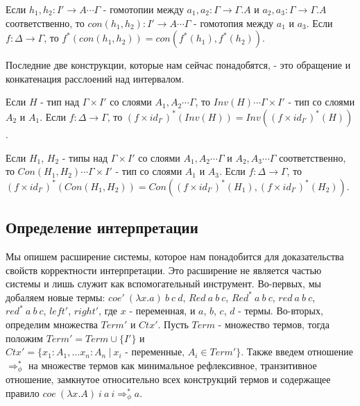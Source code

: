 \documentclass{amsart}
\theoremstyle{definition}
\theoremstyle{remark}
\newcommand{\red}{\Rightarrow}
\newcommand{\deq}{\Leftrightarrow}
\numberwithin{figure}{section}
\begin{document}
Если $h_1, h_2 : I' \to A \dotsb \Gamma$ - гомотопии между $a_1, a_2 : \Gamma \to \Gamma.A$ и $a_2, a_3 : \Gamma \to \Gamma.A$ соответственно,
    то $con(h_1, h_2) : I' \to A \dotsb \Gamma$ - гомотопия между $a_1$ и $a_3$.
Если $f : \Delta \to \Gamma$, то $f^*(con(h_1, h_2)) = con(f^*(h_1), f^*(h_2))$.

Последние две конструкции, которые нам сейчас понадобятся, - это обращение и конкатенация расслоений над интервалом.

Если $H$ - тип над $\Gamma \times I'$ со слоями $A_1, A_2 \dotsb \Gamma$, то $Inv(H) \dotsb \Gamma \times I'$ - тип со слоями $A_2$ и $A_1$.
Если $f : \Delta \to \Gamma$, то $(f \times id_{I'})^*(Inv(H)) = Inv((f \times id_{I'})^*(H))$.

Если $H_1$, $H_2$ - типы над $\Gamma \times I'$ со слоями $A_1, A_2 \dotsb \Gamma$ и $A_2, A_3 \dotsb \Gamma$ соответственно, то $Con(H_1, H_2) \dotsb \Gamma \times I'$ - тип со слоями $A_1$ и $A_3$.
Если $f : \Delta \to \Gamma$, то $(f \times id_{I'})^*(Con(H_1, H_2)) = Con((f \times id_{I'})^*(H_1), (f \times id_{I'})^*(H_2))$.

\subsection{Определение интерпретации}

Мы опишем расширение системы, которое нам понадобится для доказательства свойств корректности интерпретации.
Это расширение не является частью системы и лишь служит как вспомогательный инструмент.
Во-первых, мы добаляем новые термы: $coe'\ (\lambda x. a)\ b\ c\ d$, $Red\ a\ b\ c$, $Red^*\ a\ b\ c$, $red\ a\ b\ c$, $red^*\ a\ b\ c$, $left'$, $right'$, где $x$ - переменная, и $a$, $b$, $c$, $d$ - термы.
Во-вторых, определим множества $Term'$ и $Ctx'$.
Пусть $Term$ - множество термов, тогда положим $Term' = Term \cup \{ I' \}$ и $Ctx' = \{ x_1 : A_1, \ldots x_n : A_n\ |\ x_i \text{ - переменные, } A_i \in Term' \}$.
Также введем отношение $\red^*_\phi$ на множестве термов как минимальное рефлексивное, транзитивное отношение, замкнутое относительно всех конструкций термов и содержащее правило $coe\ (\lambda x. A)\ i\ a\ i \red^*_\phi a$.
\end{document}

